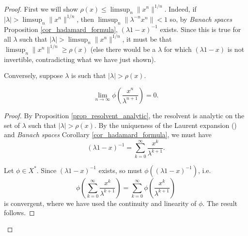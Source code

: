 \documentclass[12pt]{article}
\begin{document}
\begin{proof}
	First we will show $\rho(x) \leq \limsup_n \|x^n\|^{1/n}$. Indeed, if $|\lambda| > \limsup_n \|x^n\|^{1/n}$, then $\limsup_n \|\lambda^{-n}x^n\| < 1$ so, by \textit{Banach spaces} Proposition \ref{cor_hadamard_formula}, $(\lambda 1 - x)^{-1}$ exists. Since this is true for all $\lambda$ such that $|\lambda| > \limsup_n \|x^n\|^{1/n}$, it must be that $\limsup_n \|x^n\|^{1/n} \geq \rho(x)$ (else there would be a $\lambda$ for which $(\lambda 1 -x)$ is not invertible, contradicting what we have just shown).

	Conversely, suppose $\lambda$ is such that $|\lambda| > \rho(x)$. 

	\begin{claim}
	\label{claim_gf_pf_to_zero}
		\begin{equation*}
			\lim_{n\to\infty} \phi\left(\frac{x^n}{\lambda^{n+1}}\right) = 0.
		\end{equation*}
	\end{claim}
	\begin{proof}
		By Proposition \ref{prop_resolvent_analytic}, the resolvent is analytic on the set of $\lambda$ such that $|\lambda| > \rho(x)$. By the uniqueness of the Laurent expansion () and \textit{Banach spaces} Corollary \ref{cor_hadamard_formula}, we must have 
		\begin{equation*}
			(\lambda 1 - x)^{-1} = \sum_{k=0}^\infty \frac{x^k}{\lambda^{k+1}}.
		\end{equation*}

		Let $\phi\in X^\ast$. Since $(\lambda 1 - x)^{-1}$ exists, so must $\phi((\lambda 1 - x)^{-1})$, i.e. 
		\begin{equation*}
			\phi\left( \sum_{k=0}^\infty \frac{x^k}{\lambda^{k+1}} \right) = \sum_{k=0}^\infty \phi\left(\frac{x^k}{\lambda^{k+1}}\right)
		\end{equation*}
		is convergent, where we have used the continuity and linearity of $\phi$. The result follows.
	\end{proof}


\end{proof}
\end{document}
